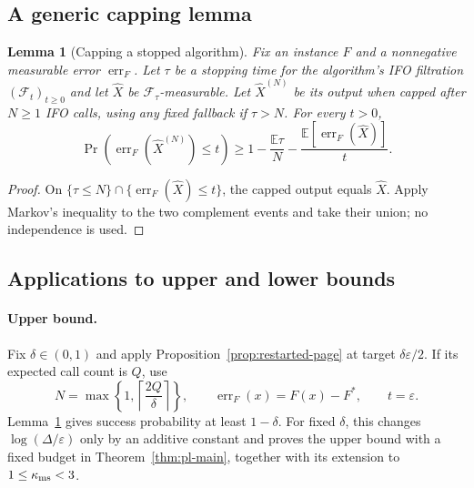 \documentclass{article}
\newcommand{\E}{\mathbb{E}}
\newtheorem{lemma}[theorem]{Lemma}
\theoremstyle{definition}
\begin{document}
\subsection{A generic capping lemma}

\begin{lemma}[Capping a stopped algorithm]
\label{lem:page-fixed-budget}
Fix an instance $F$ and a nonnegative measurable error $\operatorname{err}_F$.
Let $\tau$ be a stopping time for the algorithm's IFO filtration
$(\mathcal F_t)_{t\ge0}$ and let $\widehat X$ be $\mathcal F_\tau$-measurable.
Let $\widehat X^{(N)}$ be its output when capped after $N\ge1$ IFO calls, using
any fixed fallback if $\tau>N$.  For every $t>0$,
\begin{equation}
 \Pr\!\left(\operatorname{err}_F(\widehat X^{(N)})\le t\right)
 \ge
 1-\frac{\E\tau}{N}
   -\frac{\E[\operatorname{err}_F(\widehat X)]}{t}.
 \label{eq:generic-capping-bound}
\end{equation}
\end{lemma}

\begin{proof}
On $\{\tau\le N\}\cap\{\operatorname{err}_F(\widehat X)\le t\}$, the capped
output equals $\widehat X$.  Apply Markov's inequality to the two complement
events and take their union; no independence is used.
\end{proof}

\subsection{Applications to upper and lower bounds}

\paragraph{Upper bound.}
Fix $\delta\in(0,1)$ and apply Proposition~\ref{prop:restarted-page} at target
$\delta\varepsilon/2$.  If its expected call count is $Q$, use
\[
 N=\max\left\{1,\left\lceil\frac{2Q}{\delta}\right\rceil\right\},
 \qquad
 \operatorname{err}_F(x)=F(x)-F^*,
 \qquad t=\varepsilon.
\]
Lemma~\ref{lem:page-fixed-budget} gives success probability at least
$1-\delta$.  For fixed
$\delta$, this changes $\log(\Delta/\varepsilon)$ only by an additive constant
and proves the upper bound with a fixed budget in
Theorem~\ref{thm:pl-main}, together with its extension to
$1\le\kappa_{\rm ms}<3$.
\end{document}
